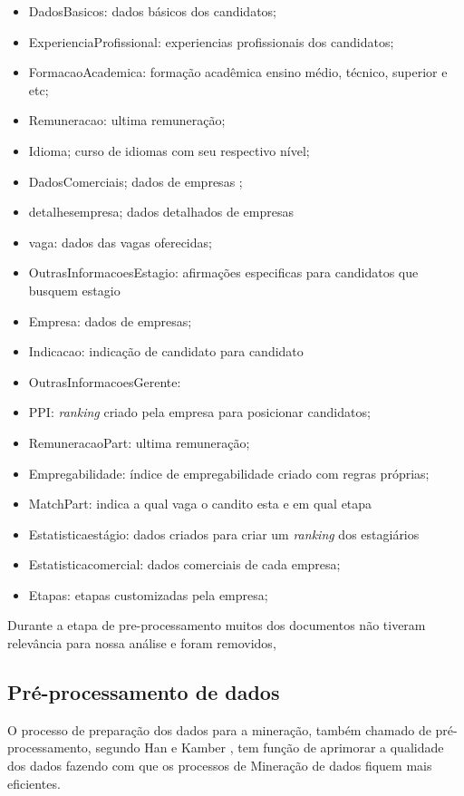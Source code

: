 \documentclass[conference]{IEEEtran}
\begin{document}
\begin{itemize}
\item DadosBasicos: dados básicos dos candidatos;
\item ExperienciaProfissional: experiencias profissionais dos candidatos;
\item FormacaoAcademica: formação acadêmica ensino médio, técnico, superior e etc;
\item Remuneracao: ultima remuneração;
\item Idioma; curso de idiomas com seu respectivo nível;
\item DadosComerciais; dados de empresas ;
\item detalhesempresa; dados detalhados de empresas
\item vaga: dados das vagas oferecidas;
\item OutrasInformacoesEstagio: afirmações especificas para candidatos que busquem estagio
\item Empresa: dados de empresas;
\item Indicacao: indicação de candidato para candidato
\item OutrasInformacoesGerente: 
\item PPI: \textit{ranking} criado pela empresa para posicionar candidatos;
\item RemuneracaoPart: ultima remuneração;
\item Empregabilidade: índice de empregabilidade criado com regras próprias;
\item MatchPart: indica a qual vaga o candito esta e em qual etapa
\item Estatisticaestágio: dados criados para criar um \textit{ranking} dos estagiários
\item Estatisticacomercial: dados comerciais de cada empresa;
\item Etapas: etapas customizadas pela empresa;
\end{itemize}

Durante a etapa de pre-processamento muitos dos documentos não tiveram relevância para nossa análise e foram removidos,

	\subsection{Pré-processamento de dados}
    O processo de preparação dos dados para a mineração, também chamado de pré-processamento, segundo Han e Kamber \cite{mineracao_conceitos_tecnicas}, tem função de aprimorar a qualidade dos dados fazendo com que os processos de Mineração de dados fiquem mais eficientes.
 
\end{document}
